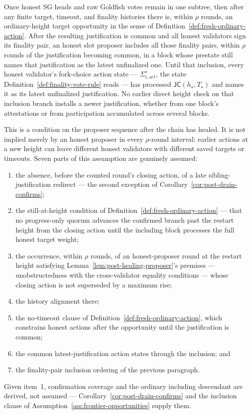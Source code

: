 \begin{assumption}
\label{ass:clean-target-opportunity}
Once honest SG heads and raw Goldfish votes remain in one subtree, then after
any finite target, timeout, and finality histories there is, within
\(\rho\) rounds, an ordinary-height target opportunity in the sense of
Definition~\ref{def:fresh-ordinary-action}.  After the resulting
justification is common and all honest validators sign its finality pair, an
honest slot proposer includes all those finality pairs, within
\(\rho\) rounds of the justification becoming common, in a block
whose prestate still names that justification as the latest unfinalized
one.
Until that inclusion, every honest validator's fork-choice action state
--- \(\Sigma_{i,\mathrm{act}}^r\), the state
Definition~\ref{def:finality-vote-rule} reads --- has
processed \(\mathsf{JC}(h_\star,T_\star)\) and names it as its latest
unfinalized justification.  No
earlier direct height check on that inclusion branch installs a newer
justification, whether from one block's attestations or from participation
accumulated across several blocks.

This is a condition on the proposer sequence after the chain has healed.  It
is not implied merely by an honest proposer in every \(\rho\)-round
interval: earlier actions at a new height can leave different honest
validators with different saved targets or timeouts.  Seven parts of this
assumption are genuinely assumed:
\begin{enumerate}
 \item the absence, before the counted round's closing action, of a
   late sibling-justification redirect --- the second exception of
   Corollary~\ref{cor:post-drain-confirms};
 \item the still-at-height condition of
   Definition~\ref{def:fresh-ordinary-action} --- that no progress-only
   quorum advances the confirmed branch past the restart height from the
   closing action until the including block processes the full honest
   target weight;
 \item the occurrence, within \(\rho\) rounds, of an
   honest-proposer round at the restart height satisfying
   Lemma~\ref{lem:post-healing-proposer}'s premises ---
   unobstructedness with the cross-validator equality conditions ---
   whose closing action is not superseded by a maximum rise;
 \item the history alignment there;
 \item the no-timeout clause of
   Definition~\ref{def:fresh-ordinary-action}, which constrains honest
   actions after the opportunity until the justification is common;
 \item the common latest-justification action states through the
   inclusion; and
 \item the finality-pair inclusion ordering of the previous paragraph.
\end{enumerate}
Given item~1, confirmation coverage and the ordinary
including descendant are derived, not assumed ---
Corollary~\ref{cor:post-drain-confirms} and the inclusion clause of
Assumption~\ref{ass:frontier-opportunities} supply them.


\end{assumption}
